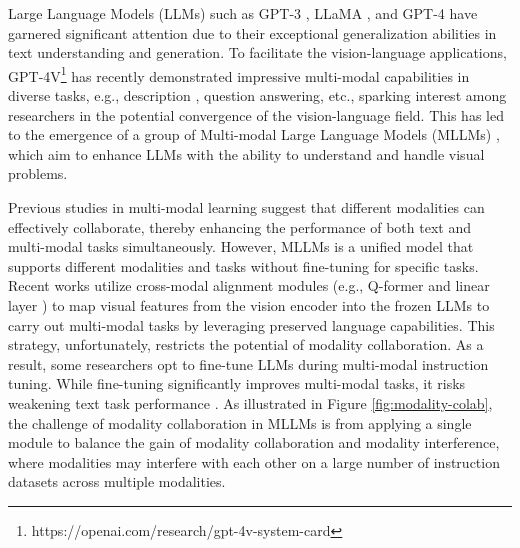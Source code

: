 \documentclass[10pt,twocolumn,letterpaper]{article}
\begin{document}
Large Language Models (LLMs) such as GPT-3 \cite{Brown2020gpt3}, LLaMA \cite{Touvron2023LLaMA, Touvron2023Llama2}, and GPT-4 \cite{OpenAI2023gpt4} have garnered significant attention due to their exceptional generalization abilities in text understanding and generation. To facilitate the vision-language applications, GPT-4V\footnote{https://openai.com/research/gpt-4v-system-card} \cite{2023GPT4VisionSC} has recently demonstrated impressive multi-modal capabilities in diverse tasks, e.g., description , question answering, etc., sparking interest among researchers in the potential convergence of the vision-language field. This has led to the emergence of a group of Multi-modal Large Language Models (MLLMs) \cite{Zhu2023MiniGPT4, Liu2023Llava, ye2023mplugowl, mplugdocowl, ye2023ureader, Bai2023QwenVL, Dai2023InstructBLIP, Li2023BLIP2}, which aim to enhance LLMs with the ability to understand and handle visual problems.



Previous studies \cite{xu2023mplug2, kwon2022masked} in multi-modal learning suggest that different modalities can effectively collaborate, thereby enhancing the performance of both text and multi-modal tasks simultaneously. However, MLLMs is a unified model that supports different modalities and tasks without fine-tuning for specific tasks. Recent works utilize cross-modal alignment modules (e.g., Q-former \cite{Zhu2023MiniGPT4, Dai2023InstructBLIP, Li2023BLIP2} and linear layer \cite{Liu2023Llava, Chen2023Shikra}) to map visual features from the vision encoder into the frozen LLMs to carry out multi-modal tasks by leveraging preserved language capabilities. This strategy, unfortunately, restricts the potential of modality collaboration. As a result, some researchers \cite{Liu2023Llava, ye2023mplugowl} opt to fine-tune LLMs during multi-modal instruction tuning. While fine-tuning significantly improves multi-modal tasks, it risks weakening text task performance \cite{Driess2023PaLME}. As illustrated in Figure \ref{fig:modality-colab}, the challenge of modality collaboration in MLLMs is from applying a single module to balance the gain of modality collaboration and modality interference, where modalities may interfere with each other on a large number of instruction datasets across multiple modalities.
\end{document}
